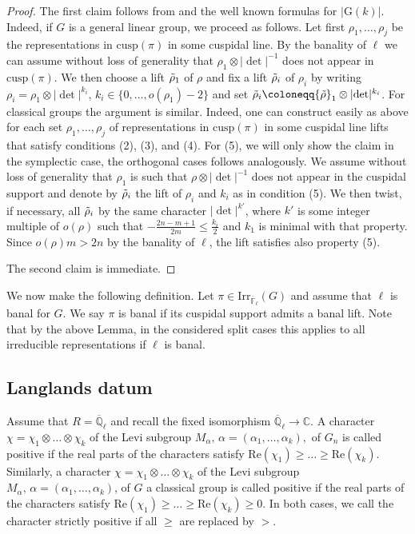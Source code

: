 \documentclass[10pt,a4paper]{article}
\theoremstyle{remark}
\theoremstyle{definition}
\newcommand{\fl}{{\overline{\mathbb{F}}_\ell}}
\newcommand{\ql}{{\overline{\mathbb{Q}}_\ell}}
\newcommand{\ra}{\rightarrow}
\newcommand{\trho}{{\Tilde{\rho}}}
\newcommand{\irr}{\mathrm{Irr}}
\newcommand{\mG}{\mathrm{G}   }
\newcommand{\cusp}{\mathrm{cusp}}
\newcommand{\CC}{\mathbb{C}}
\begin{document}
\begin{proof}
The first claim follows from  and the well known formulas for $\lvert\mG(k)\rvert$.
Indeed, if $G$ is a general linear group, we proceed as follows. Let first $\rho_1,\ldots,\rho_j$ be the representations in $\cusp(\pi)$ in some cuspidal line. By the banality of $\ell$ we can assume without loss of generality that $\rho_1\otimes \lvert\det\lvert^{-1}$ does not appear in $\cusp(\pi)$. We then choose a lift $\trho_1$ of $\rho$ and fix a lift $\trho_i$ of $\rho_i$ by writing $\rho_i=\rho_1\otimes\lvert\det\lvert^{k_i}$, $k_i\in\{0,\ldots,o(\rho_1)-2\}$ and set $\trho_i\coloneqq \trho_1\otimes\lvert\det\lvert^{k_i}$. For classical groups the argument is similar. Indeed, one can construct easily as above for each set $\rho_1,\ldots,\rho_j$ of representations in $\cusp(\pi)$ in some cuspidal line lifts that satisfy conditions (2), (3), and (4). For (5), we will only show the claim in the symplectic case, the orthogonal cases follows analogously. We assume without loss of generality that $\rho_1$ is such that $\rho\otimes\lvert\det\rvert^{-1}$ does not appear in the cuspidal support and denote by $\trho_i$ the lift of $\rho_i$ and $k_i$ as in condition (5). We then twist, if necessary, all $\trho_i$ by the same character $\lvert\det\lvert^{k'}$, where $k'$ is some integer multiple of $o(\rho)$ such that $-\frac{2n-m+1}{2m}\le \frac{k_i}{2}$ and $k_1$ is minimal with that property. Since $o(\rho)m> 2n$ by the banality of $\ell$, the lift satisfies also property (5).

    The second claim is immediate.    
\end{proof}
We now make the following definition. 
Let $\pi\in\irr_\fl(G)$ and assume that $\ell$ is banal for $G$. We say $\pi$ is banal if its cuspidal support admits a banal lift. Note that by the above Lemma, in the considered split cases this applies to all irreducible representations if $\ell$ is banal.
\subsection{Langlands datum}
Assume that $R=\ql$ and recall the fixed isomorphism $\ql\ra \CC$. 
A character $\chi=\chi_1\otimes\ldots\otimes \chi_k$ of 
the Levi subgroup $M_\alpha,\,\alpha=(\alpha_1,\ldots,\alpha_k),$ of $G_n$ is called positive if
the real parts of the characters satisfy $\mathrm{Re}(\chi_1)\ge \ldots\ge \mathrm{Re}(\chi_k)$.
Similarly, a character $\chi=\chi_1\otimes\ldots\otimes \chi_k$ of 
the Levi subgroup $M_\alpha,\,\alpha=(\alpha_1,\ldots,\alpha_k)$, of $G$ a classical group is called positive if
the real parts of the characters satisfy $\mathrm{Re}(\chi_1)\ge \ldots\ge \mathrm{Re}(\chi_k)\ge 0.$ In both cases, we call the character strictly positive if all $\ge$ are replaced by $>$.
\end{document}
